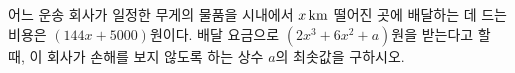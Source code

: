 어느 운송 회사가 일정한 무게의 물품을 시내에서 $x\mkern3mu \mathrm{km}$ 떨어진 곳에 배달하는 데 드는 비용은 $(144x+5000)$원이다. 배달 요금으로 $(2x^3+6x^2+a)$원을 받는다고 할 때, 이 회사가 손해를 보지 않도록 하는 상수 $a$의 최솟값을 구하시오.
